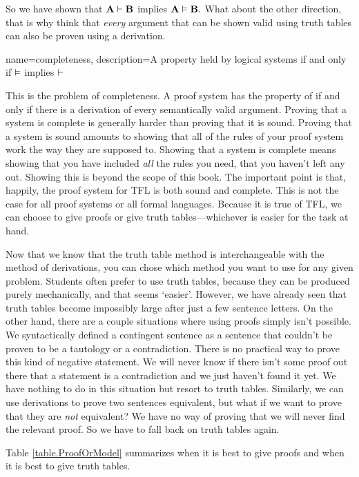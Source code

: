 So we have shown that $\mathbf{A} \vdash  \mathbf{B}$ implies $\mathbf{A} \vDash \mathbf{B}.$ What about the other direction, that is why think that \emph{every} argument that can be shown valid using truth tables can also be proven using a derivation. 

{
name=completeness,
description={A property held by logical systems if and only if $\vDash $ implies $\vdash $}
}

This is the problem of completeness. A proof system has the property of   \label{def:completeness} if and only if there is a derivation of every semantically valid argument. Proving that a system is complete is generally harder than proving that it is sound. Proving that a system is sound amounts to showing that all of the rules of your proof system work the way they are supposed to. Showing that a system is complete means showing that you have included \emph{all} the rules you need, that you haven't left any out. Showing this is beyond the scope of this book. The important point is that, happily, the proof system for TFL is both sound and complete. This is not the case for all proof systems or all formal languages. Because it is true of TFL, we can choose to give proofs or give truth tables---whichever is easier for the task at hand.

Now that we know that the truth table method is interchangeable with the method of derivations, you can chose which method you want to use for any given problem. Students often prefer to use truth tables, because they can be produced  purely mechanically, and that seems `easier'. However, we have already seen that truth tables become impossibly large after just a few sentence letters. On the other hand, there are a couple situations where using proofs simply isn't possible. We syntactically defined a contingent sentence as a sentence that couldn't be proven to be a tautology or a contradiction. There is no practical way to prove this kind of negative statement. We will never know if there isn't some proof out there that a statement is a contradiction and we just haven't found it yet. We have nothing to do in this situation but resort to truth tables. Similarly, we can use derivations to prove two sentences equivalent, but what if we want to prove that they are \emph{not} equivalent? We have no way of proving that we will never find the relevant proof. So we have to fall back on truth tables again.

Table \ref{table.ProofOrModel} summarizes when it is best to give proofs and when it is best to give truth tables. 

